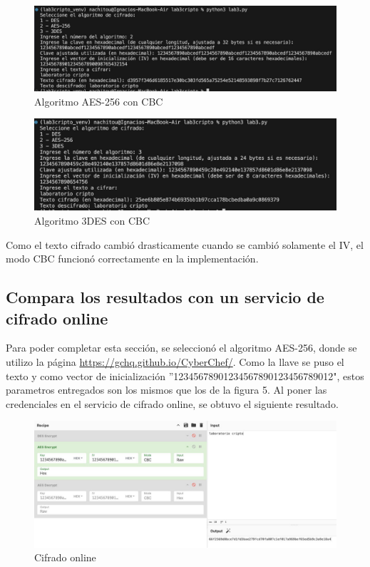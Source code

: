 \documentclass[letter,12pt]{article}
\begin{document}
\begin{figure}[H]
    \centering
    \includegraphics[width=0.8\linewidth]{imagenes/cbc aes.jpg}
    \caption{Algoritmo AES-256 con CBC}
    \label{fig:enter-label}
\end{figure}

\begin{figure}[H]
    \centering
    \includegraphics[width=0.8\linewidth]{imagenes/cbc 3des.jpg}
    \caption{Algoritmo 3DES con CBC}
    \label{fig:enter-label}
\end{figure}

Como el texto cifrado cambió drasticamente cuando se cambió solamente el IV, el modo CBC funcionó correctamente en la implementación.





\subsection{Compara los resultados con un servicio de cifrado online}

Para poder completar esta sección, se seleccionó el algoritmo AES-256, donde se utilizo la página \url{https://gchq.github.io/CyberChef/}. Como la llave se puso el texto  y como vector de inicialización ''12345678901234567890123456789012", estos parametros entregados son los mismos que los de la figura 5. Al poner las credenciales en el servicio de cifrado online, se obtuvo el siguiente resultado.


\begin{figure}[H]
    \centering
    \includegraphics[width=1.0\linewidth]{imagenes/cifrar online aes.jpg}
    \caption{Cifrado online}
    \label{fig:enter-label}
\end{figure}
\end{document}

